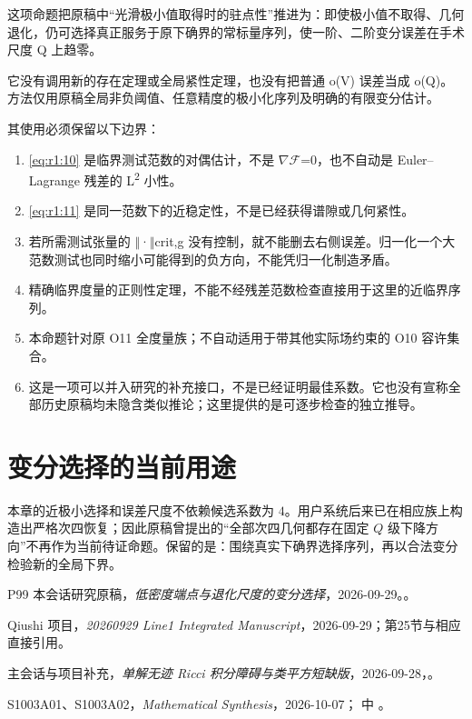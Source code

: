 \documentclass[UTF8,11pt,fontset=none]{ctexart}
\providecommand{\tightlist}{\setlength{\itemsep}{1pt}\setlength{\parskip}{0pt}}
\begin{document}
这项命题把原稿中``光滑极小值取得时的驻点性''推进为：即使极小值不取得、几何退化，仍可选择真正服务于原下确界的常标量序列，使一阶、二阶变分误差在手术尺度 Q 上趋零。

它没有调用新的存在定理或全局紧性定理，也没有把普通 o(V) 误差当成 o(Q)。方法仅用原稿全局非负阈值、任意精度的极小化序列及明确的有限变分估计。

其使用必须保留以下边界：

\begin{enumerate}
\def\labelenumi{\arabic{enumi}.}
\tightlist
\item
  \eqref{eq:r1:10} 是临界测试范数的对偶估计，不是 \(\nabla\)\(\mathscr F\)=0，也不自动是 Euler--Lagrange 残差的 L\textsuperscript{2} 小性。
\item
  \eqref{eq:r1:11} 是同一范数下的近稳定性，不是已经获得谱隙或几何紧性。
\item
  若所需测试张量的 \(\Vert\)·\(\Vert\)crit,g 没有控制，就不能删去右侧误差。归一化一个大范数测试也同时缩小可能得到的负方向，不能凭归一化制造矛盾。
\item
  精确临界度量的正则性定理，不能不经残差范数检查直接用于这里的近临界序列。
\item
  本命题针对原 O11 全度量族；不自动适用于带其他实际场约束的 O10 容许集合。
\item
  这是一项可以并入研究的补充接口，不是已经证明最佳系数。它也没有宣称全部历史原稿均未隐含类似推论；这里提供的是可逐步检查的独立推导。
\end{enumerate}

\section{变分选择的当前用途}\label{ch1:ux53d8ux5206ux9009ux62e9ux7684ux5f53ux524dux7528ux9014}

本章的近极小选择和误差尺度不依赖候选系数为 \(4\)。用户系统后来已在相应族上构造出严格次四恢复；因此原稿曾提出的``全部次四几何都存在固定 \(Q\) 级下降方向''不再作为当前待证命题。保留的是：围绕真实下确界选择序列，再以合法变分检验新的全局下界。\cite{System}

\begin{thebibliography}{P99}
\small
{} 本会话研究原稿，\emph{低密度端点与退化尺度的变分选择}，2026-09-29。。

 Qiushi 项目，\emph{20260929 Line1 Integrated Manuscript}，2026-09-29；第25节与相应直接引用。

 主会话与项目补充，\emph{单解无迹 Ricci 积分障碍与类平方短缺版}，2026-09-28，。

 S1003A01、S1003A02，\emph{Mathematical Synthesis}，2026-10-07； 中 。

\end{thebibliography}
\end{document}
